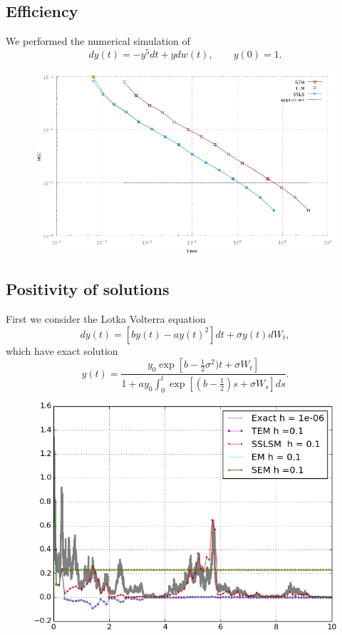 \subsection{Efficiency}
	We performed the numerical simulation of 
	\begin{equation}
		dy(t) =  -y^5 dt + ydw(t), \qquad y(0) = 1.
	\end{equation}
	\begin{figure}
		\centering
		\includegraphics[width=0.7\linewidth]{./papers/paperB/figures/MSETime2}
		\caption{}
		\label{fig:MSETime2}
	\end{figure}
\subsection{Positivity of solutions}
First we consider the Lotka Volterra equation \cite{Mao2007a}
\begin{equation}\label{eqn:LotkaVolterra}
	dy(t)= \left[by(t)-a y(t)^2\right]dt + \sigma y(t) dW_t,
\end{equation}
which have exact solution
\begin{equation}\label{eqn:LotkaVolterraSol}
	y(t) = \frac{
		y_0
		\exp\left[
		b-\frac{1}{2}\sigma^2) t
		+\sigma W_t
		\right]
		}{
		\displaystyle
		1+a 
		y_0
		\int_0^t
		\exp\left[
		(b -\frac{1}{2})s
		+\sigma W_s
		\right]ds
	}.
\end{equation}
\begin{figure}
	\centering
	\includegraphics[width=0.7\linewidth]{./papers/paperB/figures/PathsLVEv4}
	\caption{}
	\label{fig:PathsLVEv4}
\end{figure}

